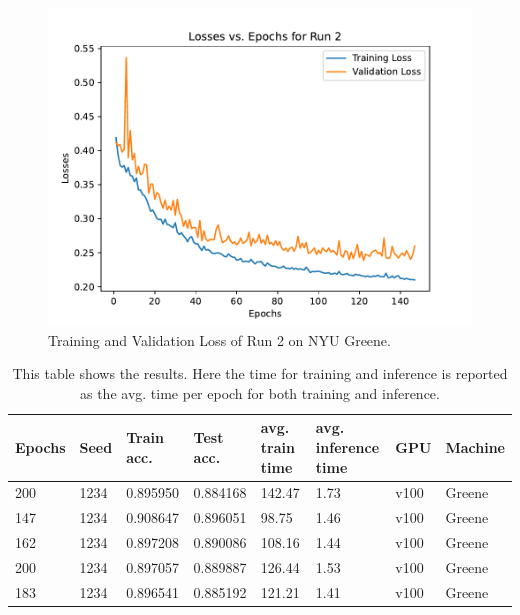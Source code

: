 \documentclass[sigplan,screen]{acmart}
\begin{document}
\begin{figure}[htb]
\centering\includegraphics[width=1.0\columnwidth]{images/epoch_vs_loss-2.pdf}
\caption{Training and Validation Loss of Run 2 on NYU Greene.}
\label{fig:Losses of Run 2}
\end{figure}



\begin{table}[thb]
    \centering
    \caption{This table shows the results. Here the time for training and inference is reported as the avg. time per epoch for both training and inference.}
    \begin{tabular}{|l|l|l|l|l|l|l|l|}
    \hline
        Epochs & Seed & Train acc. & Test acc.  & avg. train time  & avg. inference time & GPU & Machine\\ \hline
        200 & 1234 & 0.895950 & 0.884168 & 142.47 & 1.73 & v100 & Greene \\ \hline
        147 & 1234 & 0.908647 & 0.896051 & 98.75 & 1.46 & v100 & Greene\\ \hline
        162 & 1234 & 0.897208 & 0.890086 & 108.16 & 1.44 & v100 & Greene\\ \hline
        200 & 1234 & 0.897057 & 0.889887 & 126.44 & 1.53 & v100 & Greene\\ \hline
        183 & 1234 & 0.896541 & 0.885192 & 121.21 & 1.41 & v100 & Greene \\ \hline
    \end{tabular}
    \label{tab: Results}
\end{table}
\end{document}
